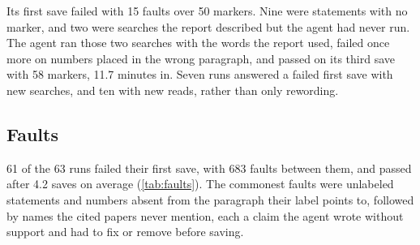Its first save failed with 15 faults over 50 markers. Nine were statements with no marker, and two were searches the report described but the agent had never run. The agent ran those two searches with the words the report used, failed once more on numbers placed in the wrong paragraph, and passed on its third save with 58 markers, 11.7 minutes in. Seven runs answered a failed first save with new searches, and ten with new reads, rather than only rewording.



\FloatBarrier
\subsection{Faults}
\label{app:faults}

61 of the 63 runs failed their first save, with 683 faults between them, and passed after 4.2 saves on average (\cref{tab:faults}). The commonest faults were unlabeled statements and numbers absent from the paragraph their label points to, followed by names the cited papers never mention, each a claim the agent wrote without support and had to fix or remove before saving.



\FloatBarrier
